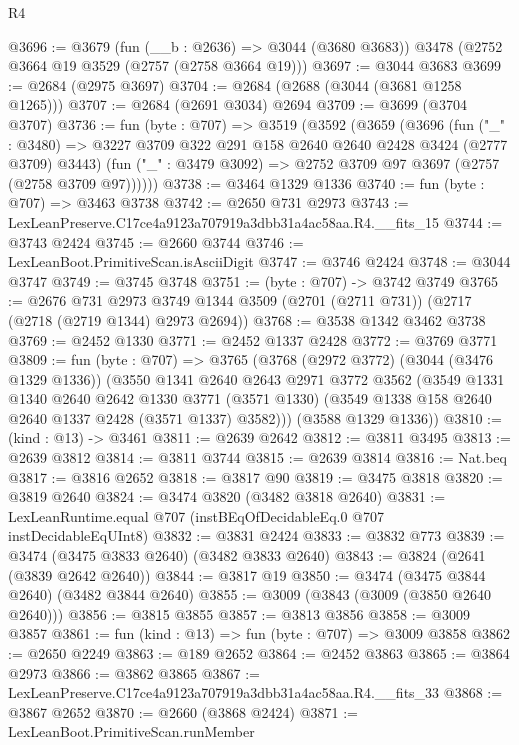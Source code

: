 \begin{lexlean}{R4}
\begin{coremodule}
@3696 := @3679
    (fun (__b : @2636) => @3044 (@3680 @3683))
    @3478
    (@2752 @3664 @19 @3529 (@2757 (@2758 @3664 @19)))
@3697 := @3044 @3683
@3699 := @2684 (@2975 @3697)
@3704 := @2684 (@2688 (@3044 (@3681 @1258 @1265)))
@3707 := @2684 (@2691 @3034) @2694
@3709 := @3699 (@3704 @3707)
@3736 := fun (byte : @707) =>
  @3519
    (@3592
      (@3659
        (@3696
          (fun ("_" : @3480) =>
          @3227 @3709 @322 @291 @158 @2640 @2640 @2428 @3424 (@2777 @3709) @3443)
          (fun ("_" : @3479 @3092) => @2752 @3709 @97 @3697 (@2757 (@2758 @3709 @97))))))
@3738 := @3464 @1329 @1336
@3740 := fun (byte : @707) => @3463 @3738
@3742 := @2650 @731 @2973
@3743 := LexLeanPreserve.C17ce4a9123a707919a3dbb31a4ac58aa.R4.__fits_15
@3744 := @3743 @2424
@3745 := @2660 @3744
@3746 := LexLeanBoot.PrimitiveScan.isAsciiDigit
@3747 := @3746 @2424
@3748 := @3044 @3747
@3749 := @3745 @3748
@3751 := (byte : @707) -> @3742 @3749
@3765 := @2676
    @731
    @2973
    @3749
    @1344
    @3509
    (@2701 (@2711 @731))
    (@2717 (@2718 (@2719 @1344) @2973 @2694))
@3768 := @3538 @1342 @3462 @3738
@3769 := @2452 @1330
@3771 := @2452 @1337 @2428
@3772 := @3769 @3771
@3809 := fun (byte : @707) =>
  @3765
    (@3768
      (@2972 @3772)
      (@3044 (@3476 @1329 @1336))
      (@3550
        @1341
        @2640
        @2643
        @2971
        @3772
        @3562
        (@3549
          @1331
          @1340
          @2640
          @2642
          @1330
          @3771
          (@3571 @1330)
          (@3549 @1338 @158 @2640 @2640 @1337 @2428 (@3571 @1337) @3582)))
      (@3588 @1329 @1336))
@3810 := (kind : @13) -> @3461
@3811 := @2639 @2642
@3812 := @3811 @3495
@3813 := @2639 @3812
@3814 := @3811 @3744
@3815 := @2639 @3814
@3816 := Nat.beq
@3817 := @3816 @2652
@3818 := @3817 @90
@3819 := @3475 @3818
@3820 := @3819 @2640
@3824 := @3474 @3820 (@3482 @3818 @2640)
@3831 := LexLeanRuntime.equal @707 (instBEqOfDecidableEq.{0} @707 instDecidableEqUInt8)
@3832 := @3831 @2424
@3833 := @3832 @773
@3839 := @3474 (@3475 @3833 @2640) (@3482 @3833 @2640)
@3843 := @3824 (@2641 (@3839 @2642 @2640))
@3844 := @3817 @19
@3850 := @3474 (@3475 @3844 @2640) (@3482 @3844 @2640)
@3855 := @3009 (@3843 (@3009 (@3850 @2640 @2640)))
@3856 := @3815 @3855
@3857 := @3813 @3856
@3858 := @3009 @3857
@3861 := fun (kind : @13) => fun (byte : @707) => @3009 @3858
@3862 := @2650 @2249
@3863 := @189 @2652
@3864 := @2452 @3863
@3865 := @3864 @2973
@3866 := @3862 @3865
@3867 := LexLeanPreserve.C17ce4a9123a707919a3dbb31a4ac58aa.R4.__fits_33
@3868 := @3867 @2652
@3870 := @2660 (@3868 @2424)
@3871 := LexLeanBoot.PrimitiveScan.runMember

\end{coremodule}
\end{lexlean}
